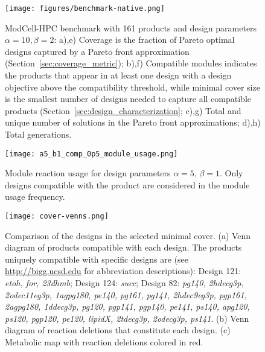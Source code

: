 \documentclass[12pt]{article}
\begin{document}
{\begin{figure}[H]
    \caption{ModCell-HPC benchmark with 161 products and design parameters $\alpha=10, \beta=2$: a),e) Coverage is the fraction of Pareto optimal designs captured by a Pareto front approximation (Section~\ref{sec:coverage_metric});
    b),f) Compatible modules indicates the products that appear in at least one design with a design objective above the compatibility threshold, while minimal cover size is the smallest number of designs needed to capture all compatible products (Section~\ref{sec:design_characterization};
    c),g) Total and unique number of solutions in the Pareto front approximations;
    d),h) Total generations.}
    \centering
    \texttt{[image: figures/benchmark-native.png]}
    \label{fig7:benchmark-161prod}
\end{figure}

\begin{figure}[H]
    \caption{Module reaction usage for design parameters $\alpha=5, \,\beta=1$. Only designs compatible with the product are considered in the module usage frequency.}%
    \centering
    \texttt{[image: a5\_b1\_comp\_0p5\_module\_usage.png]}
    \label{fig7:module-usage}
\end{figure}

\begin{figure}[H]
    \caption{Comparison of the designs in the selected minimal cover. (a) Venn diagram of products compatible with each design. The products uniquely compatible with specific designs are (see \protect\url{http://bigg.ucsd.edu} for abbreviation descriptions):
       Design 121: \textit{etoh, for, 23dhmb};
       Design 124: \textit{succ};
       Design 82: \textit{pg140, 2hdecg3p, 2odec11eg3p, 1agpg180, pe140, pg161, pg141, 2hdec9eg3p, pgp161, 2agpg180, 1ddecg3p, pg120, pgp141, pgp140, pe141, ps140, apg120, ps120, pgp120, pe120, lipidX, 2tdecg3p, 2odecg3p, ps141}.
    (b) Venn diagram of reaction deletions that constitute each design.
    (c) Metabolic map with reaction deletions colored in red.
       }
    \centering
    \texttt{[image: cover-venns.png]}
    \label{fig7:design-comparison}
\end{figure}

}
\end{document}
